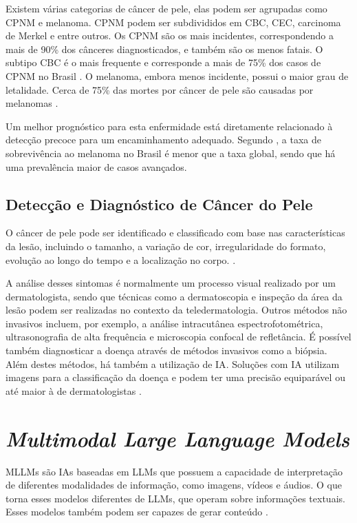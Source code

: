 Existem várias categorias de câncer de pele, elas podem ser agrupadas como \ac{CPNM} e melanoma. \ac{CPNM} podem ser
subdivididos em \ac{CBC}, \ac{CEC}, carcinoma de Merkel e entre outros. Os \ac{CPNM} são os mais incidentes,
correspondendo a mais de 90\% dos cânceres diagnosticados, e também são os menos fatais. O subtipo \ac{CBC} é o mais
frequente e corresponde a mais de 75\% dos casos de \ac{CPNM} no Brasil \cite{skin_cancer_zink}. O melanoma, embora
menos incidente, possui o maior grau de letalidade. Cerca de 75\% das mortes por câncer de pele são causadas por
melanomas \cite{skin_cancer_screening}.

Um melhor prognóstico para esta enfermidade está diretamente relacionado à detecção precoce para um encaminhamento
adequado. Segundo \textcite{skin_cancer_survival}, a taxa de sobrevivência ao melanoma no Brasil é menor que a taxa
global, sendo que há uma prevalência maior de casos avançados.

\subsection{Detecção e Diagnóstico de Câncer do Pele} \label{sec:skin_cancer_detection}

O câncer de pele pode ser identificado e classificado com base nas características da lesão, incluindo o tamanho, a
variação de cor, irregularidade do formato, evolução ao longo do tempo e a localização no corpo.
\cite{recognizing_skin_cancer}.

A análise desses sintomas é normalmente um processo visual realizado por um dermatologista, sendo que técnicas como a
dermatoscopia e inspeção da área da lesão podem ser realizadas no contexto da teledermatologia. Outros métodos não
invasivos incluem, por exemplo, a análise intracutânea espectrofotométrica, ultrasonografia de alta frequência e
microscopia confocal de refletância. É possível também diagnosticar a doença através de métodos invasivos como a
biópsia. Além destes métodos, há também a utilização de \ac{IA}. Soluções com \ac{IA} utilizam imagens para a
classificação da doença e podem ter uma precisão equiparável ou até maior à de dermatologistas
\cite{recognizing_skin_cancer, skin_cancer_ai}.

\section{\textit{Multimodal Large Language Models}}

\acp{MLLM} são \acp{IA} baseadas em \acp{LLM} que possuem a capacidade de interpretação de diferentes modalidades de
informação, como imagens, vídeos e áudios. O que torna esses modelos diferentes de \acp{LLM}, que operam sobre
informações textuais. Esses modelos também podem ser capazes de gerar conteúdo \cite{mllm_survey_2023,
mllm_survey_2024}.

